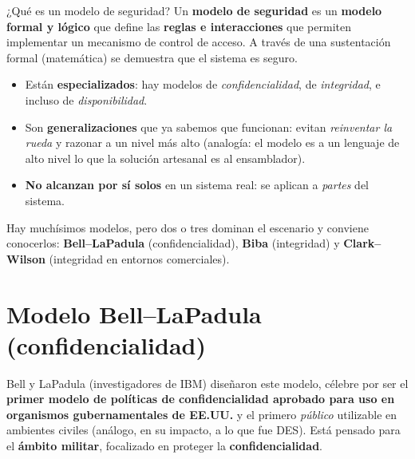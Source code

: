 \documentclass[11pt,a4paper]{article}
\begin{document}
\begin{defbox}{¿Qué es un modelo de seguridad?}
Un \textbf{modelo de seguridad} es un \textbf{modelo formal y lógico} que define las
\textbf{reglas e interacciones} que permiten implementar un mecanismo de control de acceso.
A través de una sustentación formal (matemática) se demuestra que el sistema es seguro.
\begin{itemize}[leftmargin=1.4em,itemsep=1pt]
  \item Están \textbf{especializados}: hay modelos de \emph{confidencialidad}, de
        \emph{integridad}, e incluso de \emph{disponibilidad}.
  \item Son \textbf{generalizaciones} que ya sabemos que funcionan: evitan
        \emph{reinventar la rueda} y razonar a un nivel más alto (analogía: el modelo es a un
        lenguaje de alto nivel lo que la solución artesanal es al ensamblador).
  \item \textbf{No alcanzan por sí solos} en un sistema real: se aplican a \emph{partes} del
        sistema.
\end{itemize}
\end{defbox}

Hay muchísimos modelos, pero dos o tres dominan el escenario y conviene conocerlos:
\textbf{Bell--LaPadula} (confidencialidad), \textbf{Biba} (integridad) y
\textbf{Clark--Wilson} (integridad en entornos comerciales).

\section{Modelo Bell--LaPadula (confidencialidad)}

Bell y LaPadula (investigadores de IBM) diseñaron este modelo, célebre por ser el
\textbf{primer modelo de políticas de confidencialidad aprobado para uso en organismos
gubernamentales de EE.UU.} y el primero \emph{público} utilizable en ambientes civiles
(análogo, en su impacto, a lo que fue DES). Está pensado para el \textbf{ámbito militar},
focalizado en proteger la \textbf{confidencialidad}.
\end{document}
